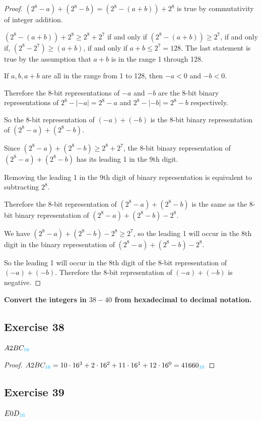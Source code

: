 \documentclass[14pt]{extarticle}
\newcommand{\base}[1]{{\color{cyan}#1}}
\begin{document}
\begin{proof}
$(2^8 - a) + (2^8 - b) = (2^8 - (a + b)) + 2^8$ is true by commutativity of integer addition.

$(2^8 - (a + b)) + 2^8 \geq 2^8 + 2^7$ if and only if $(2^8 - (a + b)) \geq 2^7$, if and only if, $(2^8 - 2^7) \geq (a + b)$, if and only if $a + b \leq 2^7 = 128$. The last statement is true by the assumption that $a+b$ is in the range 1 through 128.

If $a, b, a+b$ are all in the range from 1 to 128, then $-a < 0$ and $-b < 0$.

Therefore the 8-bit representations of $-a$ and $-b$ are the 8-bit binary representations of $2^8 - |-a| = 2^8 - a$ and $2^8 - |-b| = 2^8 - b$ respectively.

So the 8-bit representation of $(-a) + (-b)$ is the 8-bit binary representation of $(2^8 - a) + (2^8 - b)$.

Since $(2^8 - a) + (2^8 - b) \geq 2^8 + 2^7$, the 8-bit binary representation of $(2^8 - a) + (2^8 - b)$ has its leading 1 in the 9th digit.

Removing the leading 1 in the 9th digit of binary representation is equivalent to subtracting $2^8$.

Therefore the 8-bit representation of $(2^8 - a) + (2^8 - b)$ is the same as the 8-bit binary representation of $(2^8 - a) + (2^8 - b) - 2^8$.

We have $(2^8 - a) + (2^8 - b) - 2^8 \geq 2^7$, so the leading 1 will occur in the 8th digit in the binary representation of $(2^8 - a) + (2^8 - b) - 2^8$.

So the leading 1 will occur in the 8th digit of the 8-bit representation of $(-a) + (-b)$. Therefore the 8-bit representation of $(-a) + (-b)$ is negative.
\end{proof}

{\bf \color{cyan} Convert the integers in $38-40$ from hexadecimal to decimal notation.}

\subsection{Exercise 38}
$A2BC_\base{16}$

\begin{proof}
$A2BC_\base{16} = 10 \cdot 16^3 + 2 \cdot 16^2 + 11 \cdot 16^1 +
12 \cdot 16^0 = 41660_\base{10}$
\end{proof}

\subsection{Exercise 39}
$E0D_\base{16}$
\end{document}
